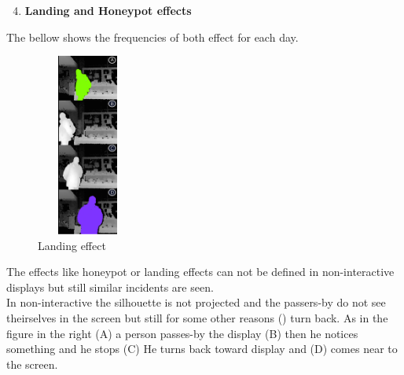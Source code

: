 \newpage
\begin{enumerate}
\setcounter{enumi}{3}
\item \textbf{Landing and Honeypot effects} \\
\end{enumerate}

The bellow shows the frequencies of both effect for each day.


\begin{figure}
  \vspace{-20pt}
  \begin{center}
    \includegraphics[width=0.30\textwidth,height=60mm]{figures/8/non_inter_findings/effects/landing}
  \end{center}
  \vspace{-20pt}
  \caption{Landing effect}
  \vspace{-10pt}
\end{figure}
The effects like honeypot or landing effects can not be defined in non-interactive displays but still similar incidents are seen. \\
In non-interactive the silhouette is not projected and the passers-by do not see theirselves in the screen but still for some other reasons () turn back. As in the figure in the right (A) a person passes-by the display (B) then he notices something and he stops (C) He turns back toward display and (D) comes near to the screen. \\



